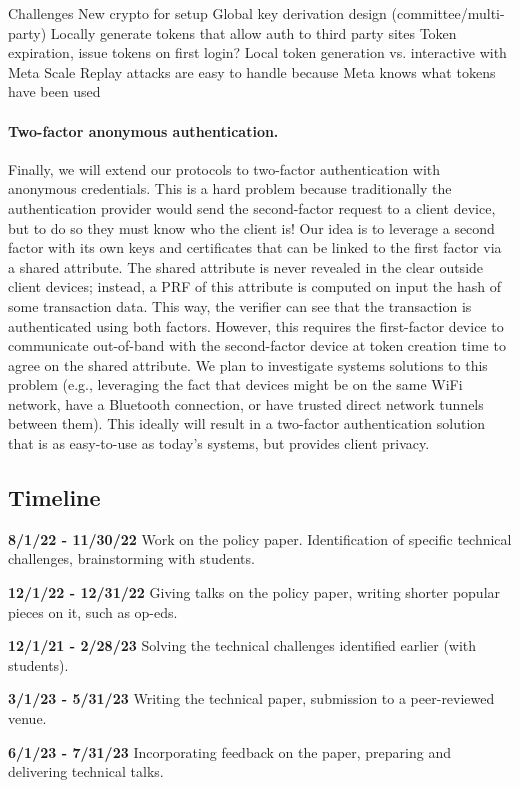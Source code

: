 \documentclass[11pt]{article}
\begin{document}
Challenges
New crypto for setup
Global key derivation design (committee/multi-party)
Locally generate tokens that allow auth to third party sites
Token expiration, issue tokens on first login?
Local token generation vs. interactive with Meta
Scale
Replay attacks are easy to handle because Meta knows what tokens have been used

\paragraph{Two-factor anonymous authentication.} Finally, we will extend our protocols to two-factor authentication with anonymous credentials. This is a hard problem because traditionally the authentication provider would send the second-factor request to a client device, but to do so they must know who the client is! Our idea is to leverage a second factor with its own keys and certificates that can be linked to the first factor via a shared attribute. The shared attribute is never revealed in the clear outside client devices; instead, a PRF of this attribute is computed on input the hash of some transaction data. This way, the verifier can see that the transaction is authenticated using both factors. However, this requires the first-factor device to communicate out-of-band with the second-factor device at token creation time to agree on the shared attribute. We plan to investigate systems solutions to this problem (e.g., leveraging the fact that devices might be on the same WiFi network, have a Bluetooth connection, or have trusted direct network tunnels between them). This ideally will result in a two-factor authentication solution that is as easy-to-use as today’s systems, but provides client privacy.

\subsection*{Timeline}

\noindent \textbf{8/1/22 - 11/30/22} Work on the policy paper. Identification of specific technical challenges, brainstorming with students.

\noindent \textbf{12/1/22 - 12/31/22} Giving talks on the policy paper, writing shorter popular pieces on it, such as op-eds.

\noindent \textbf{12/1/21 - 2/28/23} Solving the technical challenges identified earlier (with students).

\noindent \textbf{3/1/23 - 5/31/23}  Writing the technical paper, submission to a peer-reviewed venue.

\noindent \textbf{6/1/23 - 7/31/23}  Incorporating feedback on the paper, preparing and delivering technical talks.

\newpage
\setcounter{page}{1}
\small


\end{document}
